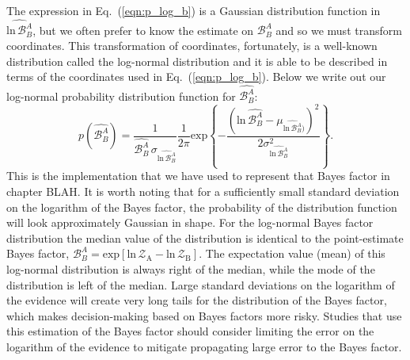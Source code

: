 The expression in Eq.~(\ref{eqn:p_log_b}) is a Gaussian distribution function in $\widehat{\mathrm{ln} \, \mathcal{B}^A_B}$, but we often prefer to know the estimate on $\mathcal{B}^A_B$ and so we must transform coordinates. This transformation of coordinates, fortunately, is a well-known distribution called the log-normal distribution and it is able to be described in terms of the coordinates used in Eq.~(\ref{eqn:p_log_b}). Below we write out our log-normal probability distribution function for $\widehat{\mathcal{B}^A_B}$:
\begin{equation}
    p(\widehat{\mathcal{B}^A_B}) = \frac{1}{\widehat{\mathcal{B}^A_B} \, \sigma_{\widehat{\mathrm{ln} \, \mathcal{B}^A_B}}} \frac{1}{2\pi} \mathrm{exp} \left \{-\frac{\left(\mathrm{ln} \, \widehat{\mathcal{B}^A_B} - \mu_{\widehat{\mathrm{ln} \, \mathcal{B}^A_B})}\right)^2} {2 \sigma^2_{\widehat{\mathrm{ln} \, \mathcal{B}^A_B}}}  \right\}.
\end{equation}
This is the implementation that we have used to represent that Bayes factor in chapter BLAH. It is worth noting that for a sufficiently small standard deviation on the logarithm of the Bayes factor, the probability of the distribution function will look approximately Gaussian in shape. For the log-normal Bayes factor distribution the median value of the distribution is identical to the point-estimate Bayes factor, $\mathcal{B}^A_B = \mathrm{exp} \left[\mathrm{ln} \, \mathcal{Z}_{\mathrm{A}} - \mathrm{ln} \, \mathcal{Z}_{\mathrm{B}} \right]$. The expectation value (mean) of this log-normal distribution is always right of the median, while the mode of the distribution is left of the median. Large standard deviations on the logarithm of the evidence will create very long tails for the distribution of the Bayes factor, which makes decision-making based on Bayes factors more risky. Studies that use this estimation of the Bayes factor should consider limiting the error on the logarithm of the evidence to mitigate propagating large error to the Bayes factor.

